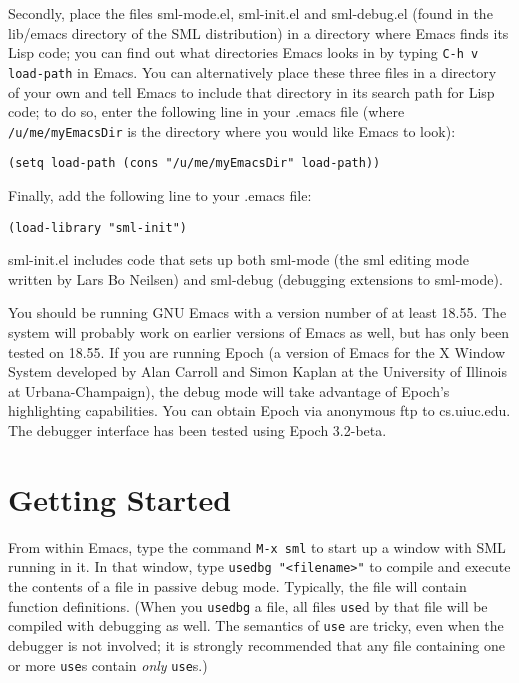 Secondly, place the files sml-mode.el, sml-init.el and sml-debug.el
(found in the lib/emacs directory of the SML distribution) in
a directory where Emacs finds its Lisp code; you can find out what
directories Emacs looks in by typing \verb'C-h v load-path' in Emacs.
You can alternatively place these three files in a directory of your own
and tell Emacs to include that directory in its search path for Lisp
code; to do so, enter the following line in your .emacs file (where
\verb'/u/me/myEmacsDir' is the directory where you would like Emacs to
look):

\begin{verbatim}
(setq load-path (cons "/u/me/myEmacsDir" load-path))
\end{verbatim}

Finally, add the following line to your .emacs file:

\begin{verbatim}
(load-library "sml-init")
\end{verbatim}

sml-init.el includes code that sets up both sml-mode (the sml editing
mode written by Lars Bo Neilsen) and sml-debug (debugging extensions
to sml-mode).

You should be running GNU Emacs with a version number of at least
18.55.  The system will probably work on earlier versions of Emacs as
well, but has only been tested on 18.55.  If you are running Epoch (a
version of Emacs for the X Window System developed by Alan Carroll and
Simon Kaplan at the University of Illinois at Urbana-Champaign), the
debug mode will take advantage of Epoch's highlighting capabilities.
You can obtain Epoch via anonymous ftp to cs.uiuc.edu.  The debugger 
interface has been tested using Epoch 3.2-beta.

\section{Getting Started}
From within Emacs, type the command \verb'M-x sml' to start up a
window with SML running in it.  In that window, type
\verb'usedbg "<filename>"' to compile and execute the contents of a
file in passive debug mode.  Typically, the file will contain function
definitions.  (When you \verb'usedbg' a file, all files \verb'use'd by
that file will be compiled with debugging as well.  The semantics of
\verb'use' are tricky, even when the debugger is not involved; it is 
strongly recommended that any file containing one or more \verb'use's 
contain {\em only} \verb'use's.)

